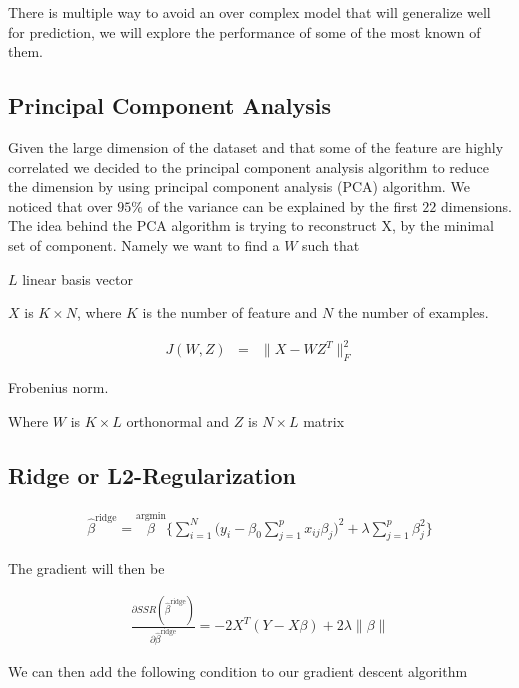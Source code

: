 \documentclass[conference]{IEEEtran}\usepackage[]{graphicx}\usepackage[]{color}
\begin{document}
There is multiple way to avoid an over complex model that will generalize well
for prediction, we will explore the performance of some of the most known of
them. 

\subsection{Principal Component Analysis}

Given the large dimension of the dataset and that some of the feature are highly
correlated we decided to the principal component analysis algorithm to reduce
the dimension by using  
principal component analysis (PCA) algorithm. We noticed that over $95\%$ of the
variance can be explained by the first $22$ dimensions. The idea behind the PCA
algorithm is trying to reconstruct X, by the minimal set of component. Namely we
want to find a $W$ such that 

$L$ linear basis vector

$X$ is $K \times N$, where $K$ is the number of feature and $N$ the number of
examples. 

\begin{eqnarray*}
  J(W, Z) &=& \| X - WZ^T\|_F^2
\end{eqnarray*}

Frobenius norm.

Where $W$ is $K \times L$ orthonormal and $Z$ is $N \times L$ matrix

\cite{murphy2012machine}
\cite{scikit-learn}

\subsection{Ridge or L2-Regularization}

\begin{eqnarray*}
  \hat{\beta}^{\text{ridge}} = \stackrel{\text{argmin}}{\beta}
  \Bigg\{ \sum_{i=1}^N \bigg(y_i - \beta_0 \sum_{j=1}^p x_{ij} \beta_j \bigg)^2 +
  \lambda \sum_{j=1}^p \beta_j^2 \Bigg\}
\end{eqnarray*}
\cite{hastie2005elements}

The gradient will then be 

\begin{eqnarray*}
  \frac{\partial SSR(\hat{\beta}^{\text{ridge}} )}{\partial
  \hat{\beta}^{\text{ridge}}} = -2 X^T (Y-X \beta) + 2 \lambda \| \beta \|
\end{eqnarray*}

We can then add the following condition to our gradient descent algorithm
\end{document}
